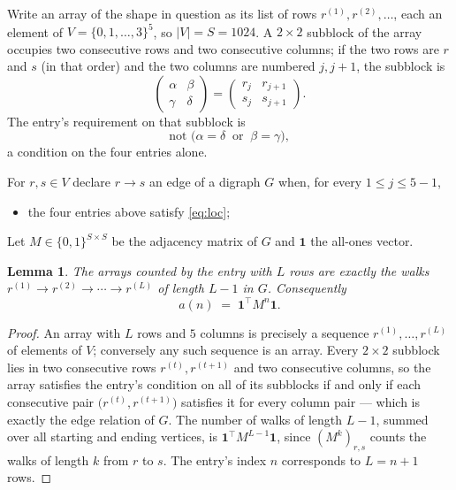 \documentclass[11pt,a4paper]{article}
\theoremstyle{plain}
\newtheorem{lemma}[theorem]{Lemma}
\theoremstyle{definition}
\begin{document}
Write an array of the shape in question as its list of rows
$r^{(1)},r^{(2)},\dots$, each an element of
$V=\{0,1,\dots,3\}^{5}$, so $|V|=S=1024$. A $2\times2$ subblock of the array
occupies two consecutive rows and two consecutive columns; if the two rows are $r$
and $s$ (in that order) and the two columns are numbered $j,j+1$,
the subblock is
\[
\begin{pmatrix}\alpha&\beta\\\gamma&\delta\end{pmatrix}=\begin{pmatrix}r_j&r_{j+1}\\s_j&s_{j+1}\end{pmatrix}.
\]
The entry's requirement on that subblock is
\begin{equation}\label{eq:loc}
\text{not }\bigl(\alpha=\delta\ \text{ or }\ \beta=\gamma\bigr),
\end{equation}
a condition on the four entries alone.

For $r,s\in V$ declare $r\to s$ an edge of a digraph $G$ when, for every
$1\le j\le 5-1$,
\begin{itemize}
\item the four entries above satisfy \eqref{eq:loc};

\end{itemize}
Let $M\in\{0,1\}^{S\times S}$ be the adjacency matrix of $G$ and $\mathbf{1}$ the
all-ones vector.

\begin{lemma}\label{lem:walk}
The arrays counted by the entry with $L$ rows are exactly the walks
$r^{(1)}\to r^{(2)}\to\cdots\to r^{(L)}$ of length $L-1$ in $G$. Consequently
\[
a(n)\;=\;\mathbf{1}^{\!\top}M^{n}\mathbf{1} .
\]
\end{lemma}

\begin{proof}
An array with $L$ rows and $5$ columns is precisely a sequence
$r^{(1)},\dots,r^{(L)}$ of elements of $V$; conversely any such sequence is an array.
Every $2\times2$ subblock lies in two consecutive rows $r^{(t)},r^{(t+1)}$ and two
consecutive columns, so the array satisfies the entry's condition on all of its subblocks
if and only if each consecutive pair $\bigl(r^{(t)},r^{(t+1)}\bigr)$ satisfies it for
every column pair --- which is exactly the edge relation of $G$. The number of walks of
length $L-1$, summed over all starting and ending vertices, is
$\mathbf{1}^{\!\top}M^{L-1}\mathbf{1}$, since $(M^{k})_{r,s}$ counts the walks of
length $k$ from $r$ to $s$. The entry's index $n$ corresponds to $L=n+1$ rows.
\end{proof}
\end{document}
